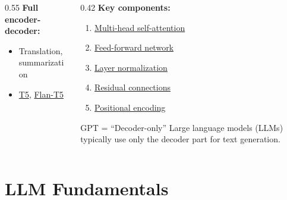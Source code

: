 \documentclass[aspectratio=169, 10pt]{beamer}
\begin{document}
\begin{frame}
\begin{columns}[T]
\begin{column}{0.55\textwidth}
            \vspace{0.2cm}
            \textbf{Full encoder-decoder:}
            \begin{itemize}
                \item Translation, summarization
                \item \href{https://arxiv.org/abs/1910.10683}{T5}, \href{https://arxiv.org/abs/2210.11416}{Flan-T5}
            \end{itemize}
        \end{column}
        \begin{column}{0.42\textwidth}
            \textbf{Key components:}
            \begin{enumerate}
                \item \href{https://en.wikipedia.org/wiki/Attention_(machine_learning)\#Multi-head_attention}{Multi-head self-attention}
                \item \href{https://en.wikipedia.org/wiki/Feedforward_neural_network}{Feed-forward network}
                \item \href{https://en.wikipedia.org/wiki/Layer_normalization}{Layer normalization}
                \item \href{https://en.wikipedia.org/wiki/Residual_neural_network}{Residual connections}
                \item \href{https://en.wikipedia.org/wiki/Positional_encoding}{Positional encoding}
            \end{enumerate}

            \vspace{0.2cm}
            \begin{block}{\footnotesize GPT = ``Decoder-only''}
                \footnotesize Large language models (LLMs) typically use only the decoder part for text generation.
            \end{block}
        \end{column}
    \end{columns}
\end{frame}

\section{LLM Fundamentals}
\end{document}
